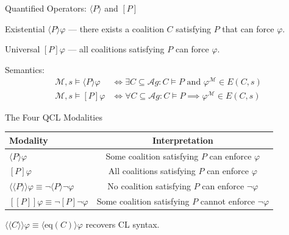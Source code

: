 \documentclass[aspectratio=169, 12pt]{beamer}
\begin{document}
\begin{frame}{Quantified Operators: $\langle P \rangle$ and $[P]$}
	\begin{block}{Existential}
		$\langle P \rangle \varphi$ --- there exists a coalition $C$ satisfying $P$ that can force $\varphi$.
	\end{block}

	\begin{block}{Universal}
		$[P] \varphi$ --- all coalitions satisfying $P$ can force $\varphi$.
	\end{block}

	\vspace{0.5em}
	Semantics:
	\begin{align*}
		\mathcal{M}, s \models \langle P \rangle \varphi & \iff \exists C \subseteq \mathcal{A}g: C \models P \text{ and } \varphi^{\mathcal{M}} \in E(C, s) \\
		\mathcal{M}, s \models [P] \varphi               & \iff \forall C \subseteq \mathcal{A}g: C \models P \implies \varphi^{\mathcal{M}} \in E(C, s)
	\end{align*}
\end{frame}


\begin{frame}{The Four QCL Modalities}
	\begin{table}
		\centering
		\begin{tabular}{lc}
			\toprule
			\textbf{Modality}                                                                        & \textbf{Interpretation}                                     \\
			\midrule
			$\langle P \rangle \varphi$                                                              & Some coalition satisfying $P$ can enforce $\varphi$         \\
			$[P] \varphi$                                                                            & All coalitions satisfying $P$ can enforce $\varphi$         \\
			$\langle\!\langle P \rangle\!\rangle \varphi \equiv \neg \langle P \rangle \neg \varphi$ & No coalition satisfying $P$ can enforce $\neg \varphi$      \\
			$[\![ P ]\!] \varphi \equiv \neg [P] \neg \varphi$                                       & Some coalition satisfying $P$ cannot enforce $\neg \varphi$ \\
			\bottomrule
		\end{tabular}
	\end{table}

	\vspace{0.5em}
	$\langle\!\langle C \rangle\!\rangle \varphi \equiv \langle \text{eq}(C) \rangle \varphi$ recovers CL syntax.
\end{frame}
\end{document}
